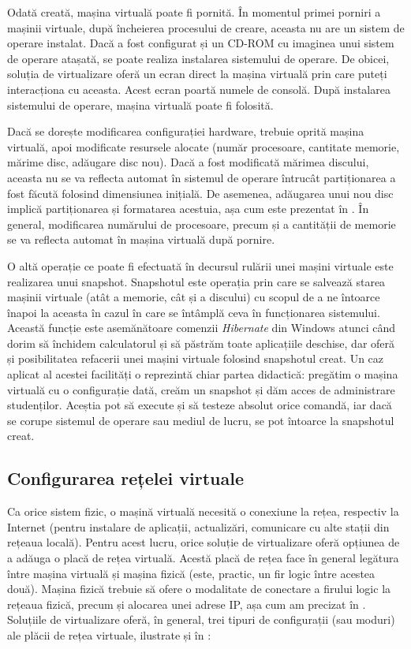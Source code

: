 Odată creată, mașina virtuală poate fi pornită.
 În momentul primei porniri a mașinii virtuale, după încheierea procesului de creare, aceasta nu are un sistem de operare instalat.
 Dacă a fost configurat și un CD-ROM cu imaginea unui sistem de operare atașată, se poate realiza instalarea sistemului de operare.
De obicei, soluția de virtualizare oferă un ecran direct la mașina virtuală prin care puteți interacționa cu aceasta.
Acest ecran poartă numele de consolă.
După instalarea sistemului de operare, mașina virtuală poate fi folosită.

Dacă se dorește modificarea configurației hardware, trebuie oprită mașina virtuală, apoi modificate resursele alocate (număr procesoare, cantitate memorie, mărime disc, adăugare disc nou).
Dacă a fost modificată mărimea discului, aceasta nu se va reflecta automat în sistemul de operare întrucât partiționarea a fost făcută folosind dimensiunea inițială.
De asemenea, adăugarea unui nou disc implică partiționarea și formatarea acestuia, așa cum este prezentat în .
În general, modificarea numărului de procesoare, precum și a cantității de memorie se va reflecta automat în mașina virtuală după pornire.

O altă operație ce poate fi efectuată în decursul rulării unei mașini virtuale este realizarea unui snapshot.
Snapshotul este operația prin care se salvează starea mașinii virtuale (atât a memorie, cât și a discului) cu scopul de a ne întoarce înapoi la aceasta în cazul în care se întâmplă ceva în funcționarea sistemului.
Această funcție este asemănătoare comenzii \textit{Hibernate} din Windows atunci când dorim să închidem calculatorul și să păstrăm toate aplicațiile deschise, dar oferă și posibilitatea refacerii unei mașini virtuale folosind snapshotul creat.
Un caz aplicat al acestei facilități o reprezintă chiar partea didactică: pregătim o mașina virtuală cu o configurație dată, creăm un snapshot și dăm acces de administrare studenților.
Aceștia pot să execute și să testeze absolut orice comandă, iar dacă se corupe sistemul de operare sau mediul de lucru, se pot întoarce la snapshotul creat.

\subsection{Configurarea rețelei virtuale}
\label{sec:vm:ops:net}

Ca orice sistem fizic, o mașină virtuală necesită o conexiune la rețea, respectiv la Internet (pentru instalare de aplicații, actualizări, comunicare cu alte stații din rețeaua locală).
Pentru acest lucru, orice soluție de virtualizare oferă opțiunea de a adăuga o placă de rețea virtuală.
Acestă placă de rețea face în general legătura între mașina virtuală și mașina fizică (este, practic, un fir logic între acestea două).
Mașina fizică trebuie să ofere o modalitate de conectare a firului logic la rețeaua fizică, precum și alocarea unei adrese IP, așa cum am precizat în .
Soluțiile de virtualizare oferă, în general, trei tipuri de configurații (sau moduri) ale plăcii de rețea virtuale, ilustrate și în :

